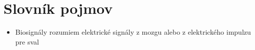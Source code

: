 \chapter*{Slovník pojmov} %
\begin{itemize}
  \item Biosignály rozumiem elektrické signály z mozgu alebo z elektrického impulzu pre sval
\end{itemize}